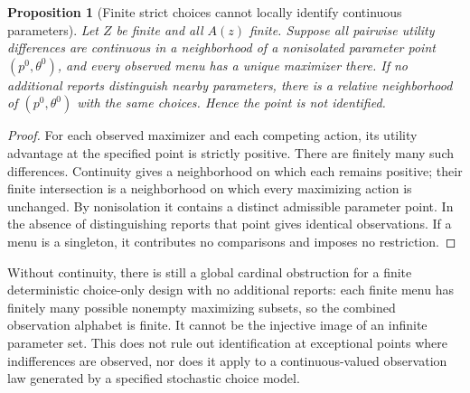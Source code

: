 \documentclass[11pt,a4paper]{article}
\newtheorem{proposition}[theorem]{Proposition}
\theoremstyle{definition}\newtheorem{definition}[theorem]{Definition}
\theoremstyle{remark}\newtheorem{remark}[theorem]{Remark}
\newcommand{\1}{\mathbf 1}
\begin{document}
\begin{proposition}[Finite strict choices cannot locally identify continuous parameters]\label{prop:finite}
Let $Z$ be finite and all $A(z)$ finite. Suppose all pairwise utility differences are continuous in a neighborhood of a nonisolated parameter point $(p^0,\theta^0)$, and every observed menu has a unique maximizer there. If no additional reports distinguish nearby parameters, there is a relative neighborhood of $(p^0,\theta^0)$ with the same choices. Hence the point is not identified.
\end{proposition}
\begin{proof}
For each observed maximizer and each competing action, its utility advantage at the specified point is strictly positive. There are finitely many such differences. Continuity gives a neighborhood on which each remains positive; their finite intersection is a neighborhood on which every maximizing action is unchanged. By nonisolation it contains a distinct admissible parameter point. In the absence of distinguishing reports that point gives identical observations. If a menu is a singleton, it contributes no comparisons and imposes no restriction.
\end{proof}
Without continuity, there is still a global cardinal obstruction for a finite deterministic choice-only design with no additional reports: each finite menu has finitely many possible nonempty maximizing subsets, so the combined observation alphabet is finite. It cannot be the injective image of an infinite parameter set. This does not rule out identification at exceptional points where indifferences are observed, nor does it apply to a continuous-valued observation law generated by a specified stochastic choice model.
\end{document}
